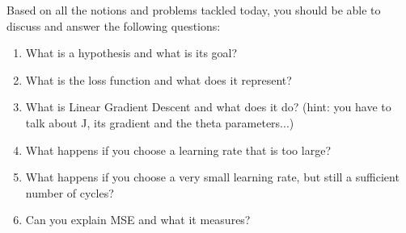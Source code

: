 \documentclass{42-en}
\begin{document}
Based on all the notions and problems tackled today, you should be able to discuss and answer the following questions:
\begin{enumerate}
  \item What is a hypothesis and what is its goal?  
  \item What is the loss function and what does it represent?   
  \item What is Linear Gradient Descent and what does it do?  
  (hint: you have to talk about J, its gradient and the theta parameters...)  
  \item What happens if you choose a learning rate that is too large?
  \item What happens if you choose a very small learning rate, but still a sufficient number of cycles?
  \item Can you explain MSE and what it measures?
\end{enumerate}
\newpage

\end{document}
